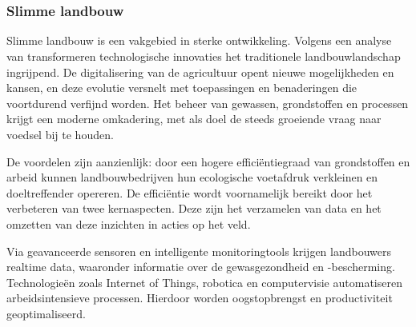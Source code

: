 \chapter{}%
\label{ch:stand-van-zaken}





\subsection*{Slimme landbouw}
Slimme landbouw is een vakgebied in sterke ontwikkeling. Volgens een analyse van \textcite{Karunathilake2023} transformeren technologische innovaties het traditionele landbouwlandschap ingrijpend. De digitalisering van de agricultuur opent nieuwe mogelijkheden en kansen, en deze evolutie versnelt met toepassingen en benaderingen die voortdurend verfijnd worden. Het beheer van gewassen, grondstoffen en processen krijgt een moderne omkadering, met als doel de steeds groeiende vraag naar voedsel bij te houden.

De voordelen zijn aanzienlijk: door een hogere efficiëntiegraad van grondstoffen en arbeid kunnen landbouwbedrijven hun ecologische voetafdruk verkleinen en doeltreffender opereren. De efficiëntie wordt voornamelijk bereikt door het verbeteren van twee kernaspecten. Deze zijn het verzamelen van data en het omzetten van deze inzichten in acties op het veld.

Via geavanceerde sensoren en intelligente monitoringtools krijgen landbouwers realtime data, waaronder informatie over de gewasgezondheid en -bescherming. Technologieën zoals Internet of Things, robotica en computervisie automatiseren arbeidsintensieve processen. Hierdoor worden oogstopbrengst en productiviteit geoptimaliseerd.

